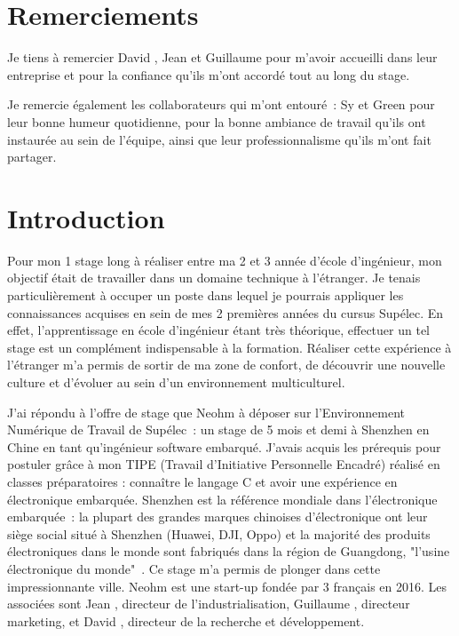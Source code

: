 \documentclass[a4paper, 12pt, sffamily]{report}
\begin{document}
\renewcommand{\contentsname}{Sommaire} %

\tableofcontents

\chapter*{Remerciements}

Je tiens à remercier David , Jean  et Guillaume  pour m’avoir accueilli dans leur entreprise et pour la confiance qu'ils m'ont accordé tout au long du stage.

Je remercie également les collaborateurs qui m’ont entouré~: Sy et Green pour leur bonne humeur quotidienne, pour la bonne ambiance de travail qu’ils ont instaurée au sein de l'équipe, ainsi que leur professionnalisme qu’ils m’ont fait partager.

\chapter{Introduction}
Pour mon 1\ier{} stage long à réaliser entre ma 2\ieme{} et 3\ieme{} année d’école d’ingénieur, mon objectif était de travailler dans un domaine technique à l’étranger. Je tenais particulièrement à occuper un poste dans lequel je pourrais appliquer les connaissances acquises en sein de mes 2 premières années du cursus Supélec. En effet, l’apprentissage en école d’ingénieur étant très théorique, effectuer un tel stage est un complément indispensable à la formation. Réaliser cette expérience à l'étranger m'a permis de sortir de ma zone de confort, de découvrir une nouvelle culture et d’évoluer au sein d’un environnement multiculturel.

J’ai répondu à l’offre de stage que Neohm à déposer sur l’Environnement Numérique de Travail de Supélec~: un stage de 5 mois et demi à Shenzhen en Chine en tant qu’ingénieur software embarqué. J’avais acquis les prérequis pour postuler grâce à mon TIPE (Travail d'Initiative Personnelle Encadré) réalisé en classes préparatoires : connaître le langage C et avoir une expérience en électronique embarquée. Shenzhen est la référence mondiale dans l’électronique embarquée~: la plupart des grandes marques chinoises d’électronique ont leur siège social situé à Shenzhen (Huawei, DJI, Oppo) et la majorité des produits électroniques dans le monde sont fabriqués dans la région de Guangdong, "l'usine électronique du monde"~\cite{article_shenzhen}. Ce stage m’a permis de plonger dans cette impressionnante ville. Neohm est une start-up fondée par 3 français en 2016. Les associées sont Jean , directeur de l’industrialisation, Guillaume , directeur marketing, et David , directeur de la recherche et développement.
\end{document}
